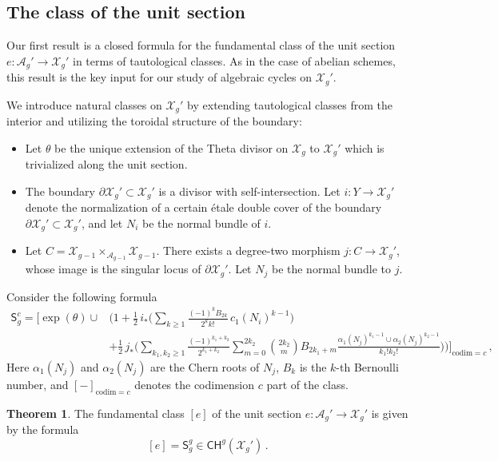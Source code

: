 \documentclass[11pt]{article}
\def\CH{\mathsf{CH}}
\def\A{\mathcal{A}}
\def\X{\mathcal{X}}
\def\codim{\mathrm{codim}}
\newcommand{\sfS}{\mathsf{S}}
\theoremstyle{definition}
\newtheorem{theoremintro}{Theorem}
\begin{document}
\subsection{The class of the unit section}

Our first result is a closed formula for the fundamental class of the unit
section $e: \A_g' \to \X_g'$ in terms of tautological classes. As in the
case of abelian schemes, this result is the key input for our study of
algebraic cycles on $\X_g'$.

We introduce natural classes on $\X_g'$ by extending tautological classes from the interior and utilizing the toroidal structure of the boundary:
\begin{itemize}
    \item Let $\theta$ be the unique extension of the Theta divisor on $\X_g$ to $\X_g'$ which is trivialized along the unit section.
    \item The boundary $\partial \mathcal X_g'\subset \X_g'$ is a divisor with self-intersection. Let $i: Y\to \X_g'$ denote the normalization of a certain \'etale double cover of the boundary $\partial \X_g' \subset \X_g'$, and let $N_i$ be the normal bundle of $i$.
    \item Let $C=\mathcal X_{g-1}\times_{\mathcal A_{g-1}}\mathcal X_{g-1}$. There exists a degree-two morphism \(j: C \to \X_g'\), whose image is the singular locus of $\partial \X_g'$. Let $N_j$ be the normal bundle to $j$.
\end{itemize}
Consider the following formula
\begin{align}
\sfS_g^c
=
\Bigg[
\exp(\theta) \cup
&\Bigg(
1
+
\frac{1}{2}\,
i_* \Bigg(\sum_{k\ge 1}
\frac{(-1)^k B_{2k}}{2^k k!}
\,c_1(N_i)^{k-1}\Bigg)\label{eq:S} \\[4pt]
&+
\frac{1}{2}\,
j_* \Bigg(
\sum_{k_1,k_2\ge 1}
\frac{(-1)^{k_1+k_2}}{2^{k_1+k_2}}
\sum_{m=0}^{2k_2}
\binom{2k_2}{m}
B_{2k_1+m}
\frac{\alpha_1(N_j)^{k_1-1}\cup\alpha_2(N_j)^{k_2-1}}{k_1!k_2!}
\Bigg)
\Bigg)
\Bigg]_{\codim = c}\,,\nonumber
\end{align}
Here $\alpha_1(N_j)$ and $\alpha_2(N_j)$ are the Chern roots of $N_j$, $B_k$ is the $k$-th Bernoulli number, and $[-]_{\codim =c}$ denotes the codimension $c$ part of the class.


\begin{theoremintro}\label{thm:unit}
	The fundamental class $[e]$ of the unit section $e:\A_g'\to \X_g'$ is given by the formula
    \[
    [e]= \sfS^g_g \in\CH^g(\X_g')\,.
    \]
\end{theoremintro}
\end{document}
